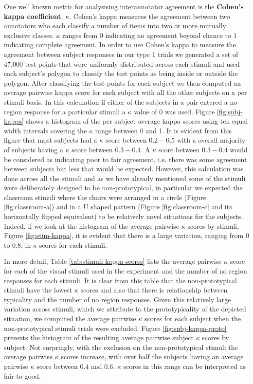 \documentclass[11pt,letterpaper]{article}
\begin{document}
One well known metric for analysising interannotator agreement is the \textbf{Cohen's kappa coefficient}, $\kappa$. Cohen's kappa measures the agreement between two annotators who each classify a number of items into two or more mutually exclusive classes. $\kappa$ ranges from 0 indicating no agreement beyond chance to 1 indicating complete agreement. In order to use Cohen's kappa to measure the agreement between subject responses in our type 1 trials we generated a set of 47,000 test points that were uniformly distributed across each stimuli and used each subject's polygon to classify the test points as being inside or outside the polygon. After classifying the test points for each subject we then computed an average pairwise kappa score for each subject with all the other subjects on a per stimuli basis. In this calculation if either of the subjects in a pair entered a no region response for a particular stimuli a $\kappa$ value of 0 was used. Figure \ref{fig:subj-kappa} shows a histogram of the per subject average kappa scores using ten equal width intervals covering the $\kappa$ range between 0 and 1.  It is evident from this figure that most subjects had a $\kappa$ score between $0.2-0.5$ with a overall majority of subjects having a $\kappa$ score between $0.3-0.4$. A $\kappa$ score between $0.3-0.4$ would be considered as indicating poor to fair agreement, i.e. there was some agreement between subjects but less that would be expected. However, this calculation was done across all the stimuli and as we have already mentioned some of the stimuli were deliberately designed to be non-prototypical, in particular we expected the classroom stimuli where the chairs were arranged in a circle (Figure \ref{fig:classroom-a}) and in a U shaped pattern (Figure \ref{fig:classroom-c} and its horizontally flipped equivalent) to be relatively novel situations for the subjects. Indeed, if we look at the histogram of the average pairwise $\kappa$ scores by stimuli, Figure \ref{fig:stim-kappa}, it is evident that there is a large variation, ranging from $0$ to $0.8$, in $\kappa$ scores for each stimuli. 

In more detail, Table \ref{tab:stimuli-kappa-scores} lists the average pairwise $\kappa$ score for each of the visual stimuli used in the experiment and the number of no region responses for each stimuli. It is clear from this table that the non-prototypical stimuli have the lowest $\kappa$ scores and also that there is relationship between typicality and the number of no region responses. Given this relatively large variation across stimuli, which we attribute to the prototypicality of the depicted situation, we computed the average pairwise $\kappa$ scores for each subject when the non-prototypical stimuli trials were excluded. Figure \ref{fig:subj-kappa-proto} presents the histogram of the resulting average pairwise subject  $\kappa$ scores by subject. Not surpringly, with the exclusion on the non-prototypical stimuli the average pairwise $\kappa$ scores increase, with over half the subjects having an average pairwise $\kappa$ score between $0.4$ and $0.6$. $\kappa$ scores in this range can be interpreted as fair to good.
\end{document}
